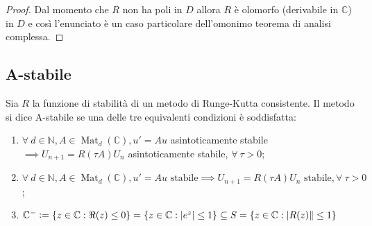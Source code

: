 \documentclass[hidelinks, 10pt]{report}
\DeclareMathOperator{\Mat}{Mat}
\begin{document}
\begin{proof}
Dal momento che $ R $ non ha poli in $ D $ allora $ R $ \`e olomorfo (derivabile in $ \mathbb{C} $) in $ D $ e cos\`i l'enunciato \`e un caso particolare dell'omonimo teorema di analisi complessa.
\end{proof}

\subsection{A-stabile}
Sia $ R $ la funzione di stabilit\`a di un metodo di Runge-Kutta consistente. Il metodo si dice A-stabile se una delle tre equivalenti condizioni \`e soddisfatta:
\begin{enumerate}
\item $ \forall\ d \in \mathbb{N}, A \in \Mat_{d}(\mathbb{C}), u' = Au $ asintoticamente stabile $ \implies U_{n + 1} = R(\tau A) U_{n} $ asintoticamente stabile, $ \forall\ \tau > 0 $;
\item $ \forall\ d \in \mathbb{N}, A \in \Mat_{d}(\mathbb{C}), u' = Au \text{ stabile} \implies U_{n + 1} = R(\tau A) U_{n} \text{ stabile}, \forall\ \tau > 0 $;
\item $ \mathbb{C}^{-} \vcentcolon= \{ z \in \mathbb{C} : \Re (z) \le 0 \} = \{ z \in \mathbb{C} : \vert e^{z} \vert \le 1 \} \subseteq S = \{ z \in \mathbb{C} : \vert R(z) \Vert \le 1 \} $
\end{enumerate}
\end{document}
